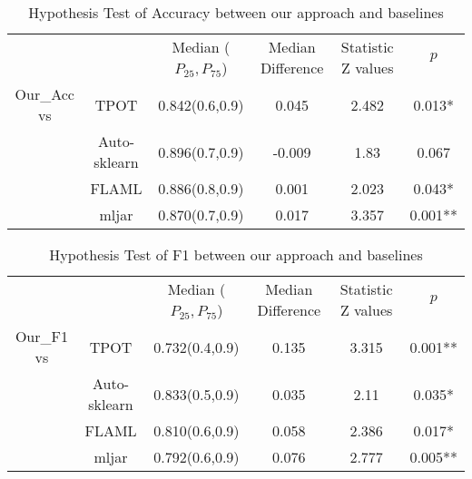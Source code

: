 \documentclass[review]{elsarticle}
\begin{document}
\begin{table}[htbp]
	\centering
	\caption{Hypothesis Test of Accuracy between our approach and baselines}
	\label{H1}
	\begin{tabular}{cccccc}
		\toprule
		~           &              & Median ($P_{25},P_{75}$) & Median Difference& Statistic Z values & $p$        \\
		Our\_Acc vs & TPOT         & 0.842(0.6,0.9)   & 0.045                                                 & 2.482                                                  & 0.013*   \\
		& Auto-sklearn & 0.896(0.7,0.9)   & -0.009                                                & 1.83                                                   & 0.067    \\
		& FLAML        & 0.886(0.8,0.9)   & 0.001                                                 & 2.023                                                  & 0.043*   \\
		& mljar        & 0.870(0.7,0.9)   & 0.017                                                 & 3.357                                                  & 0.001**  \\
		\bottomrule
	\end{tabular}
\end{table}
\begin{table}[htbp]
	\centering
	\caption{Hypothesis Test of F1 between our approach and baselines}
	\label{H2}
	\begin{tabular}{cccccc} 
		\toprule
		~          &              & Median ($P_{25},P_{75}$) & Median Difference & Statistic Z values & $p$       \\
		Our\_F1 vs & TPOT         & 0.732(0.4,0.9)   & 0.135                                                 & 3.315                                                  & 0.001**  \\
		& Auto-sklearn & 0.833(0.5,0.9)   & 0.035                                                 & 2.11                                                   & 0.035*   \\
		& FLAML        & 0.810(0.6,0.9)   & 0.058                                                 & 2.386                                                  & 0.017*   \\
		& mljar        & 0.792(0.6,0.9)   & 0.076                                                 & 2.777                                                  & 0.005**  \\
		\bottomrule
	\end{tabular}
\end{table}
\end{document}
